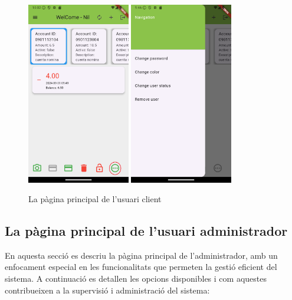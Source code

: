 \documentclass[a4paper,12pt,twoside]{ThesisStyle}
\begin{document}
\begin{figure}[h]
    \includegraphics[width=0.4\textwidth]{imatges/main102.png}
    \includegraphics[width=0.4\textwidth]{imatges/navigatorClient.png}
    \caption{La pàgina principal de l'usuari client}
    \label{fig: La pàgina principal de l'usuari client}
\end{figure}


\clearpage

\subsection{La pàgina principal de l'usuari administrador}
\label{subsec: La pàgina principal de l'usuari administrador}


En aquesta secció es descriu la pàgina principal de l'administrador, amb un enfocament especial en les funcionalitats que permeten la gestió eficient del sistema. A continuació es detallen les opcions disponibles i com aquestes contribueixen a la supervisió i administració del sistema:
\end{document}

